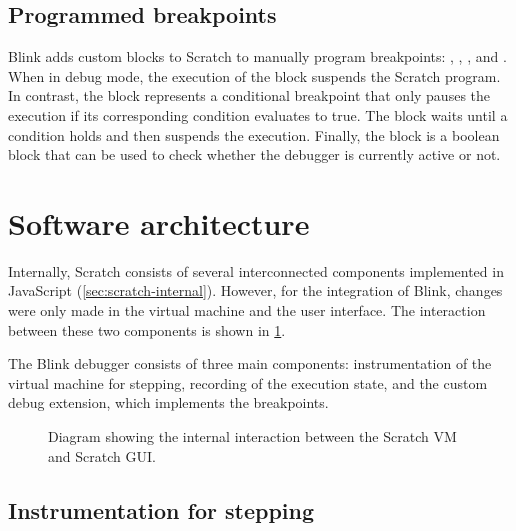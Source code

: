 \documentclass[../main]{subfiles}
\begin{document}
\subsection{Programmed breakpoints}\label{subsec:programmed-breakpoints}
Blink adds custom blocks to Scratch to manually program breakpoints: , , , and .
When in debug mode, the execution of the  block suspends the Scratch program.
In contrast, the  block represents a conditional breakpoint that only pauses the execution if its corresponding condition evaluates to true.
The  block waits until a condition holds and then suspends the execution.
Finally, the  block is a boolean block that can be used to check whether the debugger is currently active or not.

\section{Software architecture}\label{sec:blink-software-architecture}

Internally, Scratch consists of several interconnected components implemented in JavaScript (\cref{sec:scratch-internal}).
However, for the integration of Blink, changes were only made in the virtual machine and the user interface.
The interaction between these two components is shown in \cref{fig:blink-architecture}.

The Blink debugger consists of three main components: instrumentation of the virtual machine for stepping, recording of the execution state, and the custom debug extension, which implements the breakpoints.

\begin{figure}
    \centering
    
    \caption{
        Diagram showing the internal interaction between the Scratch VM and Scratch GUI\@.
    }
    \label{fig:blink-architecture}
\end{figure}

\subsection{Instrumentation for stepping}\label{subsec:instrumentation-for-stepping}
\end{document}
